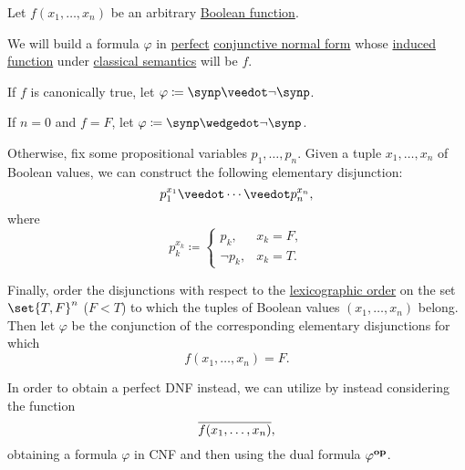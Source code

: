 \begin{algorithm}\label{alg:full_cnf_and_dnf}
  Let \( f(x_1, \ldots, x_n) \) be an arbitrary \hyperref[def:boolean_function]{Boolean function}.

  We will build a formula \( \varphi \) in \hyperref[def:full_cnf_and_dnf]{perfect} \hyperref[def:cnf_and_dnf]{conjunctive normal form} whose \hyperref[def:propositional_valuation/valuation_function]{induced function} under \hyperref[def:propositional_semantics/classical]{classical semantics} will be \( f \).

  \begin{thmenum}
     If \( f \) is canonically true, let \( \varphi \coloneqq \synp \synvee \neg \synp \).

     If \( n = 0 \) and \( f = F \), let \( \varphi \coloneqq \synp \synwedge \neg \synp \).

     Otherwise, fix some propositional variables \( p_1, \ldots, p_n \). Given a tuple \( x_1, \ldots, x_n \) of Boolean values, we can construct the following elementary disjunction:
    \begin{equation}\label{alg:full_cnf_and_dnf/cnf}
      p_1^{x_1} \synvee \cdots \synvee p_n^{x_n},
    \end{equation}
    where
    \begin{equation*}
      p_k^{x_k} \coloneqq \begin{cases}
        p_k,      &x_k = F, \\
        \neg p_k, &x_k = T.
      \end{cases}
    \end{equation*}

     Finally, order the disjunctions with respect to the \hyperref[def:lexicographic_order]{lexicographic order} on the set \( \set{ T, F }^n \) (\( F < T \)) to which the tuples of Boolean values \( (x_1, \ldots, x_n) \) belong. Then let \( \varphi \) be the conjunction of the corresponding elementary disjunctions for which
    \begin{equation*}
      f(x_1, \ldots, x_n) = F.
    \end{equation*}

     In order to obtain a perfect DNF instead, we can utilize  by instead considering the function
    \begin{equation*}
      \oline{f(x_1, \ldots, x_n)},
    \end{equation*}
    obtaining a formula \( \varphi \) in CNF and then using the dual formula \( \varphi^\oppos \).
  \end{thmenum}
\end{algorithm}
